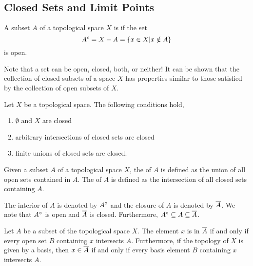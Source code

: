 \subsection{Closed Sets and Limit Points}

\begin{definition}
A subset $A$ of a topological space $X$ is  if the set
\begin{equation*}
{A}^{c} = X - A = \{ x \in X | x \notin A \}
\end{equation*}
is open.
\end{definition}

Note that a set can be open, closed, both, or neither!
It can be shown that the collection of closed subsets of a space $X$ has properties similar to those satisfied by the collection of open subsets of $X$.

\begin{fact}
Let $X$ be a topological space.
The following conditions hold,
\begin{enumerate}
\item $\emptyset$ and $X$ are closed
\item arbitrary intersections of closed sets are closed
\item finite unions of closed sets are closed.
\end{enumerate}
\end{fact}

\begin{definition}
Given a subset $A$ of a topological space $X$, the  of $A$ is defined as the union of all open sets contained in $A$.
The  of $A$ is defined as the intersection of all closed sets containing $A$.
\end{definition}

The interior of $A$ is denoted by ${A}^{\circ}$ and the closure of $A$ is denoted by $\overline{A}$.
We note that ${A}^{\circ}$ is open and $\overline{A}$ is closed.
Furthermore, ${A}^{\circ} \subseteq A \subseteq \overline{A}$.

\begin{theorem} \label{theorem:ClosureConditions}
Let $A$ be a subset of the topological space $X$.
The element $x$ is in $\overline{A}$ if and only if every open set $B$ containing $x$ intersects $A$.
Furthermore, if the topology of $X$ is given by a basis, then $x \in \overline{A}$ if and only if every basis element $B$ containing $x$ intersects $A$.
\end{theorem}

